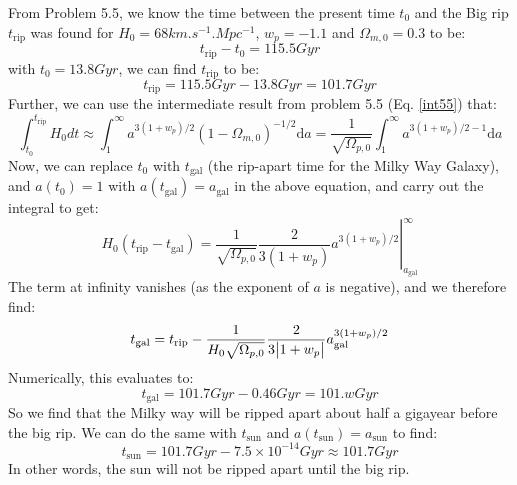 From Problem 5.5, we know the time between the present time $t_0$ and the Big rip $t_{\text{rip}}$ was found for $H_0 = 68\si{km.s^{-1}.Mpc^{-1}}$, $w_p = -1.1$ and $\Omega_{m, 0} = 0.3$ to be:
\begin{equation}
    t_{\text{rip}} - t_0 = 115.5\si{Gyr}
\end{equation}
with $t_0 = 13.8 \si{Gyr}$, we can find $t_{\text{rip}}$ to be:
\begin{equation}
    t_{\text{rip}} = 115.5\si{Gyr} - 13.8\si{Gyr} = 101.7\si{Gyr}
\end{equation}
Further, we can use the intermediate result from problem 5.5 (Eq. \eqref{int55}) that:
\begin{equation}
    \int_{t_0}^{t_{\text{rip}}}H_0 dt  \approx \int_1^\infty a^{3(1+w_p)/2}(1 - \Omega_{m, 0})^{-1/2}\mathrm d a = \frac{1}{\sqrt{\Omega_{p, 0}}}\int_1^\infty a^{3(1+w_p)/2-1}\mathrm d a
\end{equation}
Now, we can replace $t_0$ with $t_{\text{gal}}$ (the rip-apart time for the Milky Way Galaxy), and $a(t_0) = 1$ with $a(t_{\text{gal}}) = a_\text{gal}$ in the above equation, and carry out the integral to get:
\begin{equation}
    H_0(t_{\text{rip}} - t_{\text{gal}}) = \frac{1}{\sqrt{\Omega_{p, 0}}}\left.\frac{2}{3(1+w_p)}a^{3(1+w_p)/2}\right|_{a_{\text{gal}}}^\infty
\end{equation}
The term at infinity vanishes (as the exponent of $a$ is negative), and we therefore find:
\begin{equation}
    t_{\text{gal}} = t_{\text{rip}} - \frac{1}{H_0\sqrt{\Omega_{p, 0}}}\frac{2}{3\abs{1 + w_p}}a_{\text{gal}}^{3(1+w_p)/2}
\end{equation}
Numerically, this evaluates to:
\begin{equation}
    \boxed{t_{\text{gal}} = 101.7\si{Gyr} - 0.46\si{Gyr} = 101.w\si{Gyr}}
\end{equation}
So we find that the Milky way will be ripped apart about half a gigayear before the big rip. We can do the same with $t_{\text{sun}}$ and $a(t_\text{sun}) = a_{\text{sun}}$ to find:
\begin{equation}
    \boxed{t_{\text{sun}} = 101.7\si{Gyr} - 7.5\times 10^{-14}\si{Gyr} \approx 101.7\si{Gyr}}
\end{equation}
In other words, the sun will not be ripped apart until the big rip.




